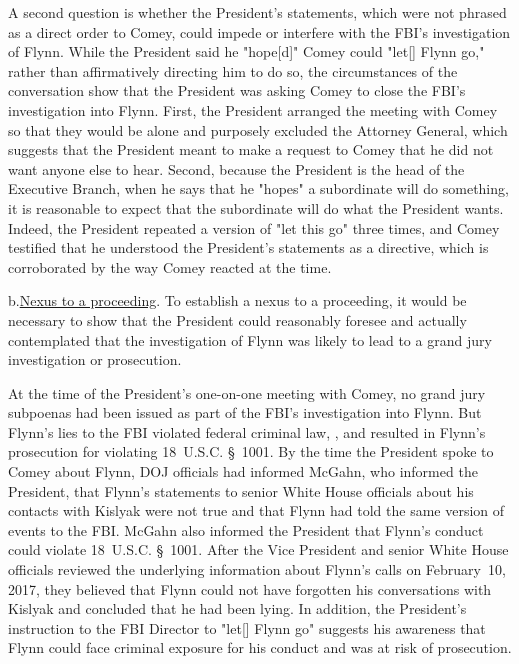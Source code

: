 A second question is whether the President's statements, which were not phrased as a direct order to Comey, could impede or interfere with the FBI's investigation of Flynn.
While the President said he "hope[d]" Comey could "let[] Flynn go," rather than affirmatively directing him to do so, the circumstances of the conversation show that the President was asking Comey to close the FBI's investigation into Flynn.
First, the President arranged the meeting with Comey so that they would be alone and purposely excluded the Attorney General, which suggests that the President meant to make a request to Comey that he did not want anyone else to hear.
Second, because the President is the head of the Executive Branch, when he says that he "hopes" a subordinate will do something, it is reasonable to expect that the subordinate will do what the President wants.
Indeed, the President repeated a version of "let this go" three times, and Comey testified that he understood the President's statements as a directive, which is corroborated by the way Comey reacted at the time.

b.\qquad\underline{Nexus to a proceeding}.
To establish a nexus to a proceeding, it would be necessary to show that the President could reasonably foresee and actually contemplated that the investigation of Flynn was likely to lead to a grand jury investigation or prosecution.

At the time of the President's one-on-one meeting with Comey, no grand jury subpoenas had been issued as part of the FBI's investigation into Flynn.
But Flynn's lies to the FBI violated federal criminal law, , and resulted in Flynn's prosecution for violating 18~U.S.C. \S~1001.
By the time the President spoke to Comey about Flynn, DOJ officials had informed McGahn, who informed the President, that Flynn's statements to senior White House officials about his contacts with Kislyak were not true and that Flynn had told the same version of events to the FBI\null.
McGahn also informed the President that Flynn's conduct could violate 18~U.S.C. \S~1001.
After the Vice President and senior White House officials reviewed the underlying information about Flynn's calls on February~10, 2017, they believed that Flynn could not have forgotten his conversations with Kislyak and concluded that he had been lying.
In addition, the President's instruction to the FBI Director to "let[] Flynn go" suggests his awareness that Flynn could face criminal exposure for his conduct and was at risk of prosecution.

